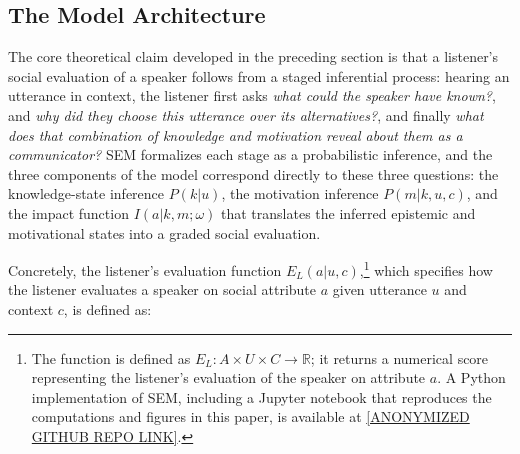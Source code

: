 \documentclass[12pt,a4paper]{article}
\begin{document}




\subsection{The Model Architecture}

The core theoretical claim developed in the preceding section is that a
listener's social evaluation of a speaker follows from a staged inferential
process: hearing an utterance in context, the listener first asks \emph{what
could the speaker have known?}, and \emph{why did they choose this utterance
over its alternatives?}, and finally \emph{what does that combination of
knowledge and motivation reveal about them as a communicator?} SEM formalizes
each stage as a probabilistic inference, and the three components of the model
correspond directly to these three questions: the knowledge-state inference
$P(k|u)$, the motivation inference $P(m|k,u,c)$, and the impact function
$I(a|k,m;\omega)$ that translates the inferred epistemic and motivational states
into a graded social evaluation.

Concretely, the listener's evaluation function
$E_L(a|u,c)$,\footnote{The function is defined as $E_L: A \times U \times C
\rightarrow \mathbb{R}$; it returns a numerical score representing the
listener's evaluation of the speaker on attribute $a$. A Python implementation
of SEM, including a Jupyter notebook that reproduces the computations and
figures in this paper, is available at \url{[ANONYMIZED GITHUB REPO LINK]}.}
which specifies how the listener evaluates a speaker on social attribute $a$
given utterance $u$ and context $c$, is defined as:
\end{document}
